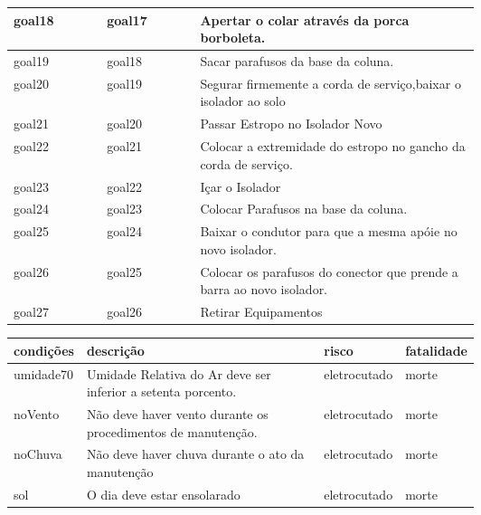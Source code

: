 \documentclass[12pt]{article}
\begin{document}
\begin{table}[H]
\begin{tabular}{|l|l|p{0.6\linewidth}|}
goal18 &  goal17 & Apertar o colar através da porca borboleta. \\ \hline
goal19 &  goal18 & Sacar parafusos da base da coluna. \\ \hline
goal20 &  goal19 & Segurar firmemente a corda de serviço,baixar o isolador ao solo \\ \hline
goal21 &  goal20 & Passar Estropo no Isolador Novo \\ \hline
goal22 &  goal21 & Colocar a extremidade do estropo no gancho da corda de serviço. \\ \hline
goal23 &  goal22 & Içar o Isolador \\ \hline
goal24 &  goal23 & Colocar Parafusos na base da coluna. \\ \hline
goal25 &  goal24 & Baixar o condutor para que a mesma apóie no novo isolador. \\ \hline
goal26 &  goal25 & Colocar os parafusos do conector que prende a barra ao novo isolador. \\ \hline
goal27 &  goal26 & Retirar Equipamentos \\ \hline
\end{tabular}
\end{table}


\begin{table}[H]
\centering
\begin{tabular}{|l|p{0.6\linewidth}|l|l|}
\hline
\textbf{condições} & \textbf{descrição} & \textbf{risco} & \textbf{fatalidade} \\ \hline
umidade70 & Umidade Relativa do Ar deve ser inferior a setenta porcento. & eletrocutado & morte \\ \hline
noVento & Não deve haver vento durante os procedimentos de manutenção. & eletrocutado & morte \\ \hline
noChuva & Não deve haver chuva durante o ato da manutenção & eletrocutado & morte \\ \hline
sol & O dia deve estar ensolarado & eletrocutado & morte \\ \hline
\end{tabular}
\end{table}
\end{document}
